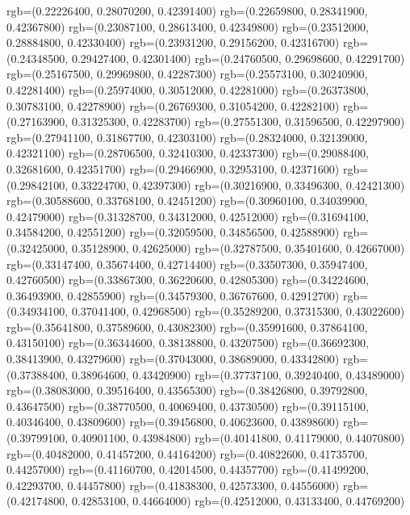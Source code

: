 {{{      rgb=(0.22226400, 0.28070200, 0.42391400)
      rgb=(0.22659800, 0.28341900, 0.42367800)
      rgb=(0.23087100, 0.28613400, 0.42349800)
      rgb=(0.23512000, 0.28884800, 0.42330400)
      rgb=(0.23931200, 0.29156200, 0.42316700)
      rgb=(0.24348500, 0.29427400, 0.42301400)
      rgb=(0.24760500, 0.29698600, 0.42291700)
      rgb=(0.25167500, 0.29969800, 0.42287300)
      rgb=(0.25573100, 0.30240900, 0.42281400)
      rgb=(0.25974000, 0.30512000, 0.42281000)
      rgb=(0.26373800, 0.30783100, 0.42278900)
      rgb=(0.26769300, 0.31054200, 0.42282100)
      rgb=(0.27163900, 0.31325300, 0.42283700)
      rgb=(0.27551300, 0.31596500, 0.42297900)
      rgb=(0.27941100, 0.31867700, 0.42303100)
      rgb=(0.28324000, 0.32139000, 0.42321100)
      rgb=(0.28706500, 0.32410300, 0.42337300)
      rgb=(0.29088400, 0.32681600, 0.42351700)
      rgb=(0.29466900, 0.32953100, 0.42371600)
      rgb=(0.29842100, 0.33224700, 0.42397300)
      rgb=(0.30216900, 0.33496300, 0.42421300)
      rgb=(0.30588600, 0.33768100, 0.42451200)
      rgb=(0.30960100, 0.34039900, 0.42479000)
      rgb=(0.31328700, 0.34312000, 0.42512000)
      rgb=(0.31694100, 0.34584200, 0.42551200)
      rgb=(0.32059500, 0.34856500, 0.42588900)
      rgb=(0.32425000, 0.35128900, 0.42625000)
      rgb=(0.32787500, 0.35401600, 0.42667000)
      rgb=(0.33147400, 0.35674400, 0.42714400)
      rgb=(0.33507300, 0.35947400, 0.42760500)
      rgb=(0.33867300, 0.36220600, 0.42805300)
      rgb=(0.34224600, 0.36493900, 0.42855900)
      rgb=(0.34579300, 0.36767600, 0.42912700)
      rgb=(0.34934100, 0.37041400, 0.42968500)
      rgb=(0.35289200, 0.37315300, 0.43022600)
      rgb=(0.35641800, 0.37589600, 0.43082300)
      rgb=(0.35991600, 0.37864100, 0.43150100)
      rgb=(0.36344600, 0.38138800, 0.43207500)
      rgb=(0.36692300, 0.38413900, 0.43279600)
      rgb=(0.37043000, 0.38689000, 0.43342800)
      rgb=(0.37388400, 0.38964600, 0.43420900)
      rgb=(0.37737100, 0.39240400, 0.43489000)
      rgb=(0.38083000, 0.39516400, 0.43565300)
      rgb=(0.38426800, 0.39792800, 0.43647500)
      rgb=(0.38770500, 0.40069400, 0.43730500)
      rgb=(0.39115100, 0.40346400, 0.43809600)
      rgb=(0.39456800, 0.40623600, 0.43898600)
      rgb=(0.39799100, 0.40901100, 0.43984800)
      rgb=(0.40141800, 0.41179000, 0.44070800)
      rgb=(0.40482000, 0.41457200, 0.44164200)
      rgb=(0.40822600, 0.41735700, 0.44257000)
      rgb=(0.41160700, 0.42014500, 0.44357700)
      rgb=(0.41499200, 0.42293700, 0.44457800)
      rgb=(0.41838300, 0.42573300, 0.44556000)
      rgb=(0.42174800, 0.42853100, 0.44664000)
      rgb=(0.42512000, 0.43133400, 0.44769200)
}}}
